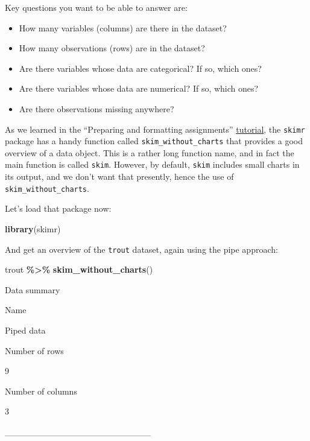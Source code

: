 \documentclass[
]{book}
\newenvironment{Shaded}{\begin{snugshade}}{\end{snugshade}}
\newcommand{\FunctionTok}[1]{\textcolor[rgb]{0.13,0.29,0.53}{\textbf{#1}}}
\newcommand{\NormalTok}[1]{#1}
\newcommand{\SpecialCharTok}[1]{\textcolor[rgb]{0.81,0.36,0.00}{\textbf{#1}}}
\providecommand{\tightlist}{%
  \setlength{\itemsep}{0pt}\setlength{\parskip}{0pt}}
\begin{document}
Key questions you want to be able to answer are:

\begin{itemize}
\tightlist
\item
  How many variables (columns) are there in the dataset?
\item
  How many observations (rows) are in the dataset?\\
\item
  Are there variables whose data are categorical? If so, which ones?
\item
  Are there variables whose data are numerical? If so, which ones?
\item
  Are there observations missing anywhere?
\end{itemize}

As we learned in the ``Preparing and formatting assignments'' \hyperref[example_answer]{tutorial}, the \texttt{skimr} package has a handy function called \texttt{skim\_without\_charts} that provides a good overview of a data object. This is a rather long function name, and in fact the main function is called \texttt{skim}. However, by default, \texttt{skim} includes small charts in its output, and we don't want that presently, hence the use of \texttt{skim\_without\_charts}.

Let's load that package now:

\begin{Shaded}
\begin{Highlighting}[]
\FunctionTok{library}\NormalTok{(skimr)}
\end{Highlighting}
\end{Shaded}

And get an overview of the \texttt{trout} dataset, again using the pipe approach:

\begin{Shaded}
\begin{Highlighting}[]
\NormalTok{trout }\SpecialCharTok{\%\textgreater{}\%}
  \FunctionTok{skim\_without\_charts}\NormalTok{()}
\end{Highlighting}
\end{Shaded}

\label{tab:unnamed-chunk-25}Data summary

Name

Piped data

Number of rows

9

Number of columns

3

\_\_\_\_\_\_\_\_\_\_\_\_\_\_\_\_\_\_\_\_\_\_\_
\end{document}
